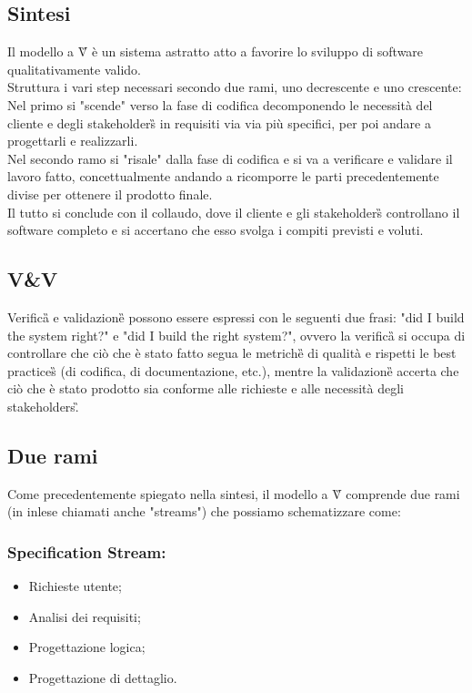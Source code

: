 \subsection{Sintesi}
Il modello a V\G{} è un sistema astratto atto a favorire lo sviluppo di software qualitativamente valido.\\
Struttura i vari step necessari secondo due rami, uno decrescente e uno crescente:\\
Nel primo si "scende" verso la fase di codifica decomponendo le necessità del cliente e degli stakeholders\G{}
in requisiti via via più specifici, per poi andare a progettarli e realizzarli.\\
Nel secondo ramo si "risale" dalla fase di codifica e si va a verificare e validare il lavoro fatto,
concettualmente andando a ricomporre le parti precedentemente divise per ottenere il prodotto finale.\\
Il tutto si conclude con il collaudo, dove il cliente e gli stakeholders\G{} controllano il software completo
e si accertano che esso svolga i compiti previsti e voluti. 

\subsection{V\&V}
Verifica\G{} e validazione\G{} possono essere espressi con le seguenti due frasi: "did I build the system right?"
e "did I build the right system?", ovvero la verifica\G{} si occupa di controllare che ciò che è stato
fatto segua le metriche\G{} di qualità e rispetti le best practices\G{} (di codifica, di documentazione, etc.), 
mentre la validazione\G{} accerta che ciò che è stato prodotto sia conforme alle
richieste e alle necessità degli stakeholders\G.

\subsection{Due rami}
Come precedentemente spiegato nella sintesi, il modello a V\G{} comprende due rami (in inlese chiamati anche
"streams") che possiamo schematizzare come: 
\subsubsection*{Specification Stream:}
\begin{itemize}
    \item Richieste utente;
    \item Analisi dei requisiti;
    \item Progettazione logica;
    \item Progettazione di dettaglio.
\end{itemize}

